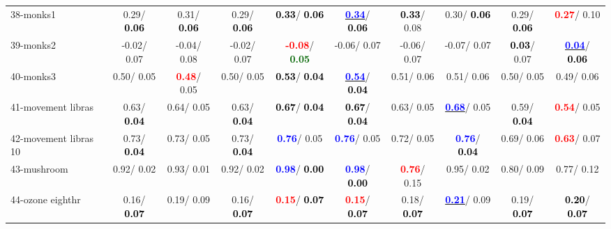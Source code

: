 \begin{table}[h]
\begin{center}
{\begin{tabular}{lc|c|c|c|c|c|c|c|c}
38-monks1 &   0.29/\textcolor{black}{\textbf{  0.06}} &   0.31/\textcolor{black}{\textbf{  0.06}} &   0.29/\textcolor{black}{\textbf{  0.06}} & \textcolor{black}{\textbf{  0.33}}/\textcolor{black}{\textbf{  0.06}} & \underline{\textcolor{blue}{\textbf{  0.34}}}/\textcolor{black}{\textbf{  0.06}} & \textcolor{black}{\textbf{  0.33}}/  0.08 &   0.30/\textcolor{black}{\textbf{  0.06}} &   0.29/\textcolor{black}{\textbf{  0.06}} & \textcolor{red}{\textbf{  0.27}}/  0.10 \\
39-monks2 &  -0.02/  0.07 &  -0.04/  0.08 &  -0.02/  0.07 & \textcolor{red}{\textbf{ -0.08}}/\textcolor{darkgreen}{\textbf{  0.05}} &  -0.06/  0.07 &  -0.06/  0.07 &  -0.07/  0.07 & \textcolor{black}{\textbf{  0.03}}/  0.07 & \underline{\textcolor{blue}{\textbf{  0.04}}}/\textcolor{black}{\textbf{  0.06}} \\ \hline
40-monks3 &   0.50/  0.05 & \textcolor{red}{\textbf{  0.48}}/  0.05 &   0.50/  0.05 & \textcolor{black}{\textbf{  0.53}}/\textcolor{black}{\textbf{  0.04}} & \underline{\textcolor{blue}{\textbf{  0.54}}}/\textcolor{black}{\textbf{  0.04}} &   0.51/  0.06 &   0.51/  0.06 &   0.50/  0.05 &   0.49/  0.06 \\
41-movement libras &   0.63/\textcolor{black}{\textbf{  0.04}} &   0.64/  0.05 &   0.63/\textcolor{black}{\textbf{  0.04}} & \textcolor{black}{\textbf{  0.67}}/\textcolor{black}{\textbf{  0.04}} & \textcolor{black}{\textbf{  0.67}}/\textcolor{black}{\textbf{  0.04}} &   0.63/  0.05 & \underline{\textcolor{blue}{\textbf{  0.68}}}/  0.05 &   0.59/\textcolor{black}{\textbf{  0.04}} & \textcolor{red}{\textbf{  0.54}}/  0.05 \\
42-movement libras 10 &   0.73/\textcolor{black}{\textbf{  0.04}} &   0.73/  0.05 &   0.73/\textcolor{black}{\textbf{  0.04}} & \textcolor{blue}{\textbf{  0.76}}/  0.05 & \textcolor{blue}{\textbf{  0.76}}/  0.05 &   0.72/  0.05 & \textcolor{blue}{\textbf{  0.76}}/\textcolor{black}{\textbf{  0.04}} &   0.69/  0.06 & \textcolor{red}{\textbf{  0.63}}/  0.07 \\
43-mushroom &   0.92/  0.02 &   0.93/  0.01 &   0.92/  0.02 & \textcolor{blue}{\textbf{  0.98}}/\textcolor{black}{\textbf{  0.00}} & \textcolor{blue}{\textbf{  0.98}}/\textcolor{black}{\textbf{  0.00}} & \textcolor{red}{\textbf{  0.76}}/  0.15 &   0.95/  0.02 &   0.80/  0.09 &   0.77/  0.12 \\
44-ozone eighthr &   0.16/\textcolor{black}{\textbf{  0.07}} &   0.19/  0.09 &   0.16/\textcolor{black}{\textbf{  0.07}} & \textcolor{red}{\textbf{  0.15}}/\textcolor{black}{\textbf{  0.07}} & \textcolor{red}{\textbf{  0.15}}/\textcolor{black}{\textbf{  0.07}} &   0.18/\textcolor{black}{\textbf{  0.07}} & \underline{\textcolor{blue}{\textbf{  0.21}}}/  0.09 &   0.19/\textcolor{black}{\textbf{  0.07}} & \textcolor{black}{\textbf{  0.20}}/\textcolor{black}{\textbf{  0.07}} \\

\end{tabular}}
\end{center}
\end{table}
